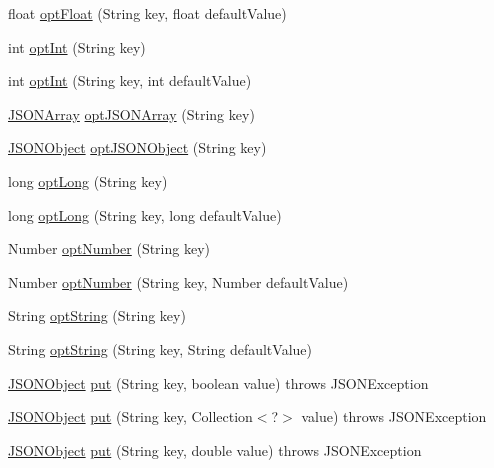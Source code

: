 \begin{DoxyCompactItemize}
float \hyperlink{classorg_1_1json_1_1JSONObject_a0954db33b1a3c33b493310798218c9a9}{opt\-Float} (String key, float default\-Value)
\item 
int \hyperlink{classorg_1_1json_1_1JSONObject_abeb2c17bd5a09ab51b25e4b330983a97}{opt\-Int} (String key)
\item 
int \hyperlink{classorg_1_1json_1_1JSONObject_a80567fb28cd07b9d5148d7610605305e}{opt\-Int} (String key, int default\-Value)
\item 
\hyperlink{classorg_1_1json_1_1JSONArray}{J\-S\-O\-N\-Array} \hyperlink{classorg_1_1json_1_1JSONObject_a1e0dce653705a1df438636fbb4fe94e2}{opt\-J\-S\-O\-N\-Array} (String key)
\item 
\hyperlink{classorg_1_1json_1_1JSONObject}{J\-S\-O\-N\-Object} \hyperlink{classorg_1_1json_1_1JSONObject_aa1024c804613178b09532ef7549e7b2b}{opt\-J\-S\-O\-N\-Object} (String key)
\item 
long \hyperlink{classorg_1_1json_1_1JSONObject_af37dbbf760c1833402c986a62c4baef8}{opt\-Long} (String key)
\item 
long \hyperlink{classorg_1_1json_1_1JSONObject_aa826ad7537ebfac8adda13f53ee0008b}{opt\-Long} (String key, long default\-Value)
\item 
Number \hyperlink{classorg_1_1json_1_1JSONObject_a1c71caf892b19475f16140b917ba47d0}{opt\-Number} (String key)
\item 
Number \hyperlink{classorg_1_1json_1_1JSONObject_a7cbdf3b15e0a5a7925739e216bf90e3d}{opt\-Number} (String key, Number default\-Value)
\item 
String \hyperlink{classorg_1_1json_1_1JSONObject_afee65e7bb15356d0fa9006ef391449e0}{opt\-String} (String key)
\item 
String \hyperlink{classorg_1_1json_1_1JSONObject_a6501a2a9b5a97560d74337c082a32732}{opt\-String} (String key, String default\-Value)
\item 
\hyperlink{classorg_1_1json_1_1JSONObject}{J\-S\-O\-N\-Object} \hyperlink{classorg_1_1json_1_1JSONObject_a92b8b4edda8b4805abca24f5b689748b}{put} (String key, boolean value)  throws J\-S\-O\-N\-Exception 
\item 
\hyperlink{classorg_1_1json_1_1JSONObject}{J\-S\-O\-N\-Object} \hyperlink{classorg_1_1json_1_1JSONObject_ae1461f04b8ba9133aaf689e1ef192295}{put} (String key, Collection$<$?$>$ value)  throws J\-S\-O\-N\-Exception 
\item 
\hyperlink{classorg_1_1json_1_1JSONObject}{J\-S\-O\-N\-Object} \hyperlink{classorg_1_1json_1_1JSONObject_a669cae1e6dd7bcab4a55d4a7078a0e72}{put} (String key, double value)  throws J\-S\-O\-N\-Exception 

\end{DoxyCompactItemize}
